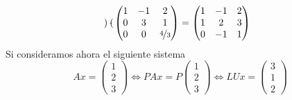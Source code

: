\begin{ejem}
$$\begin{pmatrix}
 \end{pmatrix}\cdot\begin{pmatrix}
 1 & -1 & 2 \\ 0 & 3 & 1 \\ 0 & 0 & \nicefrac{4}{3}
 \end{pmatrix}=\begin{pmatrix}
    1&-1&2\\1& 2& 3\\0&-1&1
 \end{pmatrix}$$
 Si consideramos ahora el siguiente sistema $$Ax=\begin{pmatrix}
     1 \\ 2 \\ 3
 \end{pmatrix} \iff PAx=P\begin{pmatrix}
     1 \\ 2 \\ 3
 \end{pmatrix} \iff LUx=\begin{pmatrix}
     3 \\ 1 \\ 2
 \end{pmatrix} $$
\end{ejem}

